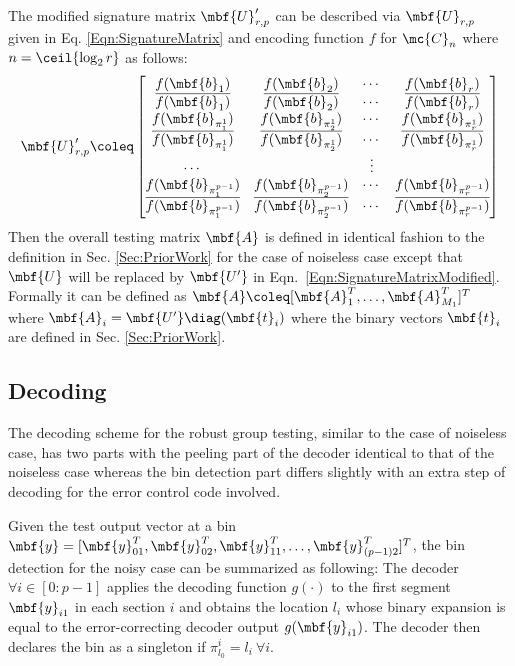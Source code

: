 \documentclass[conference,twocolumn]{IEEEtran}
\begin{document}
The modified signature matrix $\mbf{U}'_{r,p}$ can be described via $\mbf{U}_{r, p}$ given in Eq. \eqref{Eqn:SignatureMatrix} and encoding function $f$ for $\mc{C}_n$ where $n=\ceil{\log_2 r}$ as follows:
 \begin{align}
\label{Eqn:SignatureMatrixModified}
\mbf{U}_{r,p}'\coleq\begin{bmatrix}
f(\mbf{b}_1)  & f(\mbf{b}_2) &\cdots & f(\mbf{b}_r) \\
\overline{f(\mbf{b}_1)} & \overline{f(\mbf{b}_2)} & \cdots & \overline{f(\mbf{b}_r)}\\
f(\mbf{b}_{\pi^{1}_{1}}) & f(\mbf{b}_{\pi^{1}_{2}}) & \cdots & f(\mbf{b}_{\pi^{1}_{r}})\\
\overline{f(\mbf{b}_{\pi^{1}_{1}})} & \overline{f(\mbf{b}_{\pi^{1}_{2}})} & \cdots & \overline{f(\mbf{b}_{\pi^{1}_{r}})}\\
\cdots &  &\vdots \\
f(\mbf{b}_{\pi^{p-1}_{1}}) & f(\mbf{b}_{\pi^{p-1}_{2}}) & \cdots & f(\mbf{b}_{\pi^{p-1}_{r}})\\
\overline{f(\mbf{b}_{\pi^{p-1}_{1}})} & \overline{f(\mbf{b}_{\pi^{p-1}_{2}})} & \cdots & \overline{f(\mbf{b}_{\pi^{p-1}_{r}})}\\
\end{bmatrix}
\end{align}  
Then the overall testing matrix $\mbf{A}$ is defined in identical fashion to the definition in Sec. \ref{Sec:PriorWork} for the case of noiseless case except that $\mbf{U}$ will be replaced by $\mbf{U'}$ in Eqn.~\eqref{Eqn:SignatureMatrixModified}. Formally it can be defined as $\mbf{A}\coleq [\mbf{A}_{1}^{T},\ldots,\mbf{A}_{M_{1}}^{T}]^T$ where $\mbf{A}_{i}=\mbf{U'} \diag (\mbf{t}_i)$ where the binary vectors $\mbf{t}_i$ are defined in Sec. \ref{Sec:PriorWork}. 

\subsection*{Decoding}
The decoding scheme for the robust group testing, similar to the case of noiseless case, has two parts with the peeling part of the decoder identical to that of the noiseless case whereas the bin detection part differs slightly with an extra step of decoding for the error control code involved.

Given the test output vector at a bin $\mbf{y}=[\mbf{y}^{T}_{01},\mbf{y}^{T}_{02},\mbf{y}^{T}_{11},\ldots,\mbf{y}^{T}_{(p-1)2}]^T$, the bin detection for the noisy case can be summarized as following: The decoder $\forall i\in[0:p-1]$ applies the decoding function $g(\cdot)$ to the first segment $\mbf{y}_{i1}$ in each section $i$ and obtains the location $l_i$ whose binary expansion is equal to the error-correcting decoder output  $g(\mbf{y}_{i1})$. The decoder then declares the bin as a singleton if $\pi_{l_0}^{i}=l_i~\forall i$.
\end{document}
